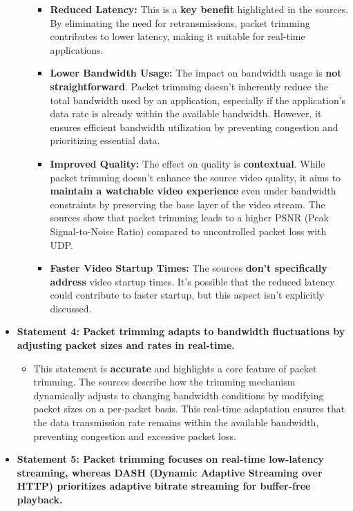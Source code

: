 \documentclass[
]{article}
\begin{document}
\begin{itemize}
\begin{itemize}
\begin{itemize}
    \item
      \textbf{Reduced Latency:} This is a \textbf{key benefit}
      highlighted in the sources. By eliminating the need for
      retransmissions, packet trimming contributes to lower latency,
      making it suitable for real-time applications.
    \item
      \textbf{Lower Bandwidth Usage:} The impact on bandwidth usage is
      \textbf{not straightforward}. Packet trimming doesn't inherently
      reduce the total bandwidth used by an application, especially if
      the application's data rate is already within the available
      bandwidth. However, it ensures efficient bandwidth utilization by
      preventing congestion and prioritizing essential data.
    \item
      \textbf{Improved Quality:} The effect on quality is
      \textbf{contextual}. While packet trimming doesn't enhance the
      source video quality, it aims to \textbf{maintain a watchable
      video experience} even under bandwidth constraints by preserving
      the base layer of the video stream. The sources show that packet
      trimming leads to a higher PSNR (Peak Signal-to-Noise Ratio)
      compared to uncontrolled packet loss with UDP.
    \item
      \textbf{Faster Video Startup Times:} The sources \textbf{don't
      specifically address} video startup times. It's possible that the
      reduced latency could contribute to faster startup, but this
      aspect isn't explicitly discussed.
    \end{itemize}
  \end{itemize}
\item
  \textbf{Statement 4: Packet trimming adapts to bandwidth fluctuations
  by adjusting packet sizes and rates in real-time.}

  \begin{itemize}
  
  \item
    This statement is \textbf{accurate} and highlights a core feature of
    packet trimming. The sources describe how the trimming mechanism
    dynamically adjusts to changing bandwidth conditions by modifying
    packet sizes on a per-packet basis. This real-time adaptation
    ensures that the data transmission rate remains within the available
    bandwidth, preventing congestion and excessive packet loss.
  \end{itemize}
\item
  \textbf{Statement 5: Packet trimming focuses on real-time low-latency
  streaming, whereas DASH (Dynamic Adaptive Streaming over HTTP)
  prioritizes adaptive bitrate streaming for buffer-free playback.}


\end{itemize}
\end{document}
